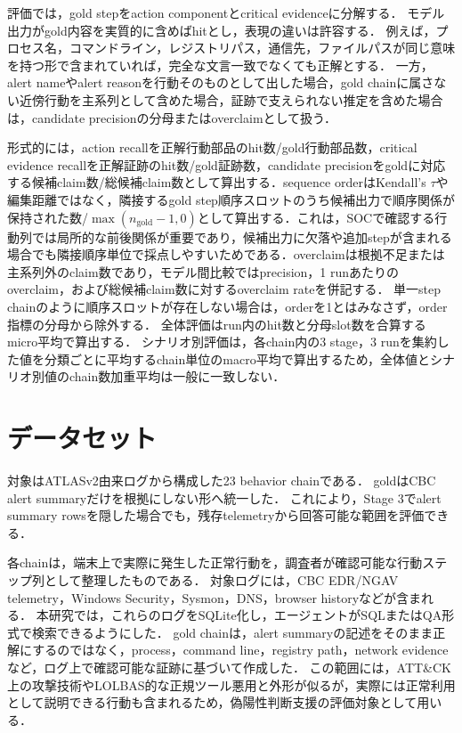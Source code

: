 \documentclass[a4paper,twocolumn,10pt]{article}
\begin{document}
評価では，gold stepをaction componentとcritical evidenceに分解する．
モデル出力がgold内容を実質的に含めばhitとし，表現の違いは許容する．
例えば，プロセス名，コマンドライン，レジストリパス，通信先，ファイルパスが同じ意味を持つ形で含まれていれば，完全な文言一致でなくても正解とする．
一方，alert nameやalert reasonを行動そのものとして出した場合，gold chainに属さない近傍行動を主系列として含めた場合，証跡で支えられない推定を含めた場合は，candidate precisionの分母またはoverclaimとして扱う．

形式的には，action recallを正解行動部品のhit数/gold行動部品数，critical evidence recallを正解証跡のhit数/gold証跡数，candidate precisionをgoldに対応する候補claim数/総候補claim数として算出する．sequence orderはKendall's $\tau$や編集距離ではなく，隣接するgold step順序スロットのうち候補出力で順序関係が保持された数/\(\max(n_{\mathrm{gold}}-1,0)\)として算出する．これは，SOCで確認する行動列では局所的な前後関係が重要であり，候補出力に欠落や追加stepが含まれる場合でも隣接順序単位で採点しやすいためである．overclaimは根拠不足または主系列外のclaim数であり，モデル間比較ではprecision，1 runあたりのoverclaim，および総候補claim数に対するoverclaim rateを併記する．
単一step chainのように順序スロットが存在しない場合は，orderを1とはみなさず，order指標の分母から除外する．
全体評価はrun内のhit数と分母slot数を合算するmicro平均で算出する．
シナリオ別評価は，各chain内の3 stage，3 runを集約した値を分類ごとに平均するchain単位のmacro平均で算出するため，全体値とシナリオ別値のchain数加重平均は一般に一致しない．

\section{データセット}

対象はATLASv2由来ログ\cite{atlasv2}から構成した23 behavior chainである．
goldはCBC alert summaryだけを根拠にしない形へ統一した．
これにより，Stage 3でalert summary rowsを隠した場合でも，残存telemetryから回答可能な範囲を評価できる．

各chainは，端末上で実際に発生した正常行動を，調査者が確認可能な行動ステップ列として整理したものである．
対象ログには，CBC EDR/NGAV telemetry，Windows Security，Sysmon\cite{sysmon}，DNS，browser historyなどが含まれる．
本研究では，これらのログをSQLite化し，エージェントがSQLまたはQA形式で検索できるようにした．
gold chainは，alert summaryの記述をそのまま正解にするのではなく，process，command line，registry path，network evidenceなど，ログ上で確認可能な証跡に基づいて作成した．
この範囲には，ATT\&CK上の攻撃技術やLOLBAS的な正規ツール悪用と外形が似るが，実際には正常利用として説明できる行動も含まれるため，偽陽性判断支援の評価対象として用いる．
\end{document}
